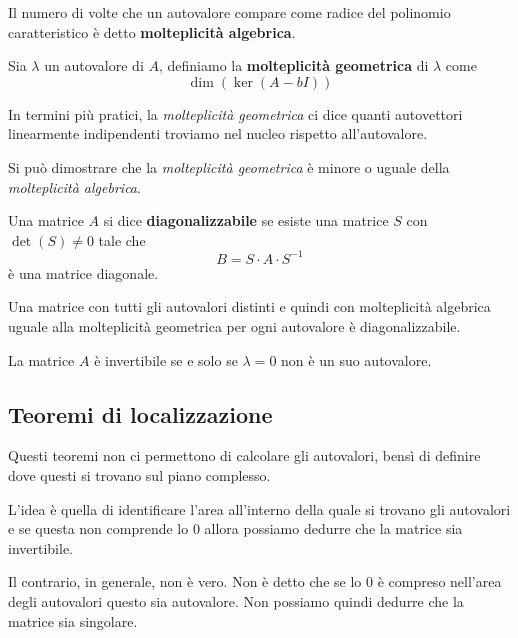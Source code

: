 \begin{definition}
	Il numero di volte che un autovalore compare come radice del polinomio caratteristico è detto
	\textbf{molteplicità algebrica}.
\end{definition}

\begin{definition}
	Sia $\lambda$ un autovalore di $A$, definiamo la \textbf{molteplicità geometrica} di $\lambda$ come
	\[ \dim (\ker (A - b I)) \]
\end{definition}

In termini più pratici, la \emph{molteplicità geometrica} ci dice quanti autovettori linearmente indipendenti
troviamo nel nucleo rispetto all'autovalore.

Si può dimostrare che la \emph{molteplicità geometrica} è minore o uguale della \emph{molteplicità algebrica}.

\begin{definition}
	Una matrice $A$ si dice \textbf{diagonalizzabile} se esiste una matrice $S$ con $\det (S) \neq 0$ tale che
	\[ B = S \cdot A \cdot S^{-1} \]
	è una matrice diagonale.
\end{definition}

\begin{theorem}
	Una matrice con tutti gli autovalori distinti e quindi con molteplicità algebrica uguale alla molteplicità
	geometrica per ogni autovalore è diagonalizzabile.
\end{theorem}

\begin{theorem}
	La matrice $A$ è invertibile se e solo se $\lambda = 0$ non è un suo autovalore.
\end{theorem}

\subsection{Teoremi di localizzazione}
Questi teoremi non ci permettono di calcolare gli autovalori, bensì di definire dove questi si trovano sul piano
complesso.

L'idea è quella di identificare l'area all'interno della quale si trovano gli autovalori e se questa non comprende
lo 0 allora possiamo dedurre che la matrice sia invertibile.

Il contrario, in generale, non è vero. Non è detto che se lo 0 è compreso nell'area degli autovalori questo sia
autovalore. Non possiamo quindi dedurre che la matrice sia singolare.

